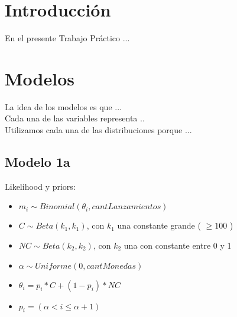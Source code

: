 \documentclass[a4paper]{article}
\begin{document}

\maketitle
\newpage

\tableofcontents
\newpage

%
\section{Introducción}
% 
En el presente Trabajo Práctico ...


\section{Modelos}
La idea de los modelos es que ... \\
Cada una de las variables representa .. \\
Utilizamos cada una de las distribuciones porque ... \\


\subsection{Modelo 1a}
\newline
Likelihood y priors: \\
\begin{itemize}
	\item $ m_i \sim Binomial(\theta_i, cantLanzamientos) $
	\item $ C \sim Beta(k_1, k_1) $, con $k_1$ una constante grande ( $\geq 100 $ )
	\item $ NC \sim Beta(k_2, k_2) $, con $k_2$ una con constante entre 0 y 1 
	\item $ \alpha \sim Uniforme(0,cantMonedas) $
	\item $ \theta_i = p_i * C + (1 - p_i) * NC $
	\item $ p_i = (\alpha < i \leq \alpha + 1) $
\end{itemize}
\end{document}
